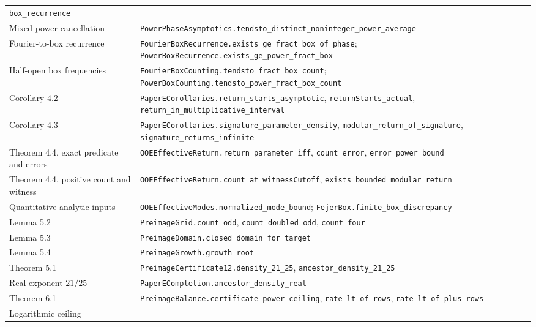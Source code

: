 \documentclass[11pt,a4paper]{article}
\begin{document}
\begin{longtable}[]{@{}
  >{\raggedright\arraybackslash}p{}
  >{\raggedright\arraybackslash}p{}@{}}
\texttt{\nolinkurl{box_recurrence}} \\
Mixed-power cancellation &
\texttt{\nolinkurl{PowerPhaseAsymptotics.tendsto_distinct_noninteger_power_average}} \\
Fourier-to-box recurrence &
\texttt{\nolinkurl{FourierBoxRecurrence.exists_ge_fract_box_of_phase}};
\texttt{\nolinkurl{PowerBoxRecurrence.exists_ge_power_fract_box}} \\
Half-open box frequencies &
\texttt{\nolinkurl{FourierBoxCounting.tendsto_fract_box_count}};
\texttt{\nolinkurl{PowerBoxCounting.tendsto_power_fract_box_count}} \\
Corollary 4.2 &
\texttt{\nolinkurl{PaperECorollaries.return_starts_asymptotic}},
\texttt{\nolinkurl{returnStarts_actual}},
\texttt{\nolinkurl{return_in_multiplicative_interval}} \\
Corollary 4.3 &
\texttt{\nolinkurl{PaperECorollaries.signature_parameter_density}},
\texttt{\nolinkurl{modular_return_of_signature}},
\texttt{\nolinkurl{signature_returns_infinite}} \\
Theorem 4.4, exact predicate and errors &
\texttt{\nolinkurl{OOEEffectiveReturn.return_parameter_iff}},
\texttt{\nolinkurl{count_error}},
\texttt{\nolinkurl{error_power_bound}} \\
Theorem 4.4, positive count and witness &
\texttt{\nolinkurl{OOEEffectiveReturn.count_at_witnessCutoff}},
\texttt{\nolinkurl{exists_bounded_modular_return}} \\
Quantitative analytic inputs &
\texttt{\nolinkurl{OOEEffectiveModes.normalized_mode_bound}};
\texttt{\nolinkurl{FejerBox.finite_box_discrepancy}} \\
Lemma 5.2 & \texttt{\nolinkurl{PreimageGrid.count_odd}},
\texttt{\nolinkurl{count_doubled_odd}},
\texttt{\nolinkurl{count_four}} \\
Lemma 5.3 &
\texttt{\nolinkurl{PreimageDomain.closed_domain_for_target}} \\
Lemma 5.4 & \texttt{\nolinkurl{PreimageGrowth.growth_root}} \\
Theorem 5.1 & \texttt{\nolinkurl{PreimageCertificate12.density_21_25}},
\texttt{\nolinkurl{ancestor_density_21_25}} \\
Real exponent \(21/25\) &
\texttt{\nolinkurl{PaperECompletion.ancestor_density_real}} \\
Theorem 6.1 &
\texttt{\nolinkurl{PreimageBalance.certificate_power_ceiling}},
\texttt{\nolinkurl{rate_lt_of_rows}},
\texttt{\nolinkurl{rate_lt_of_plus_rows}} \\
Logarithmic ceiling &

\end{longtable}
\end{document}
